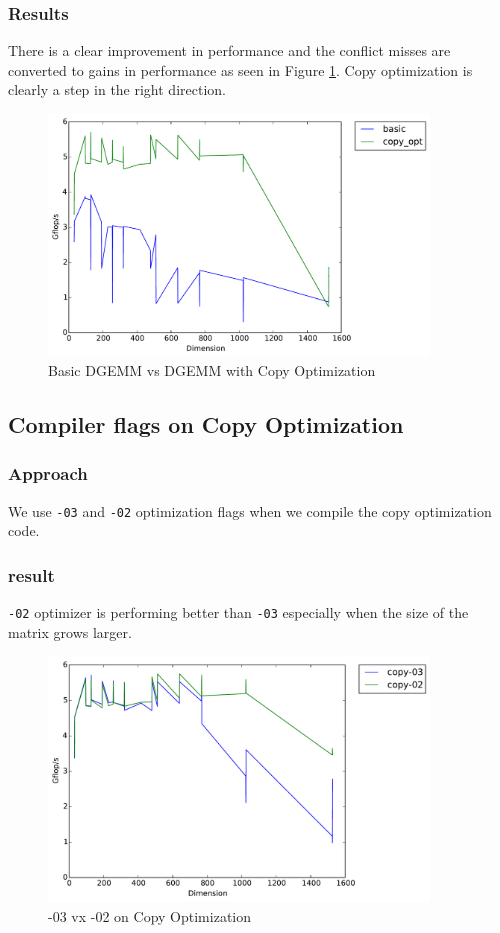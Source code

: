 \documentclass[11pt]{article}
\theoremstyle{plain}
\theoremstyle{definition}
\begin{document}
\subsubsection{Results}
There is a clear improvement in performance and the conflict misses are converted to gains in performance as seen in Figure \ref{basic_copy_opt}. Copy optimization is clearly a step in the right direction.
\begin{figure}[H]
    \includegraphics[width=0.9\textwidth]{timing_basic_vs_copy_opt.pdf}
    \caption{Basic DGEMM vs DGEMM with Copy Optimization}
    \label{basic_copy_opt}
\end{figure} 
\subsection{Compiler flags on Copy Optimization}
\subsubsection{Approach}
We use \texttt{-03} and \texttt{-02} optimization flags when we compile the copy optimization code.
\subsubsection{result}
\texttt{-02} optimizer is performing better than \texttt{-03}  especially when the size of the matrix grows larger.
\begin{figure}[H]
    \includegraphics[width=0.9\textwidth]{timing_flag0203_copy.pdf}
    \caption{-03 vx -02 on Copy Optimization}
    \label{0203}
\end{figure}
 
\end{document}
